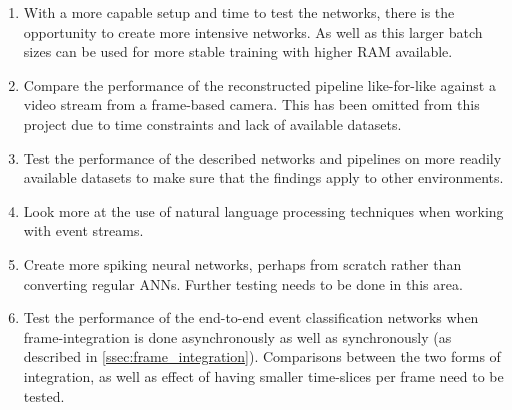 \begin{enumerate}
    \item With a more capable setup and time to test the networks, there is the opportunity to create more intensive networks. As well as this larger batch sizes can be used for more stable training with higher RAM available.
    \item Compare the performance of the reconstructed pipeline like-for-like against a video stream from a frame-based camera. This has been omitted from this project due to time constraints and lack of available datasets.
    \item Test the performance of the described networks and pipelines on more readily available datasets to make sure that the findings apply to other environments.
    \item Look more at the use of natural language processing techniques when working with event streams.
    \item Create more spiking neural networks, perhaps from scratch rather than converting regular ANNs. Further testing needs to be done in this area.
    \item Test the performance of the end-to-end event classification networks when frame-integration is done asynchronously as well as synchronously (as described in \cref{ssec:frame_integration}). Comparisons between the two forms of integration, as well as effect of having smaller time-slices per frame need to be tested.
\end{enumerate}